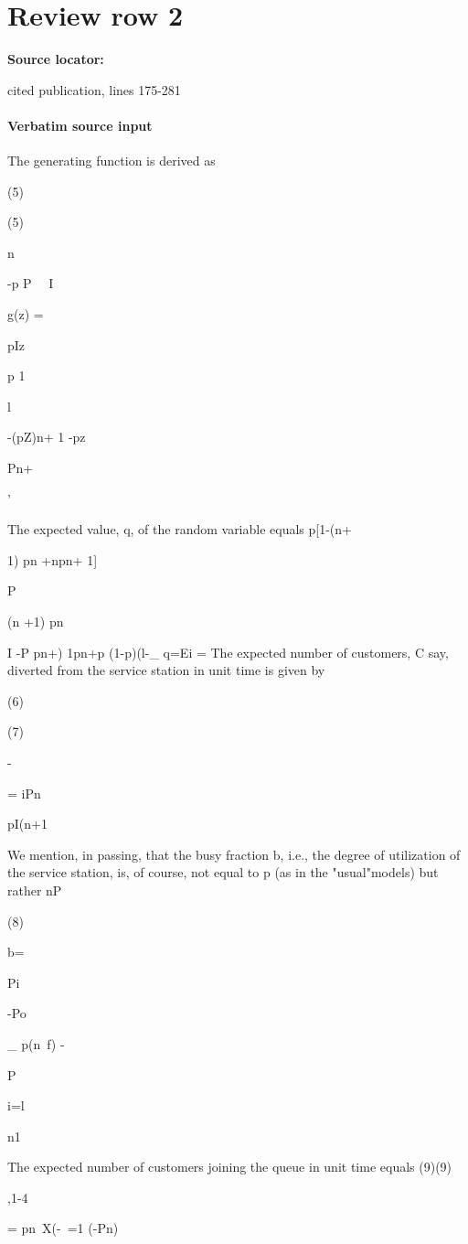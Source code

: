 \documentclass[10pt]{article}
\begin{document}
\section*{Review row 2}
\textbf{Source locator:} {\footnotesize\raggedright cited publication, lines 175-\allowbreak{}281\par}
\paragraph{Verbatim source input}
\begin{ReviewVerbatim}
The generating function is derived as

(5)

(5)

n

-p P
~~I

g(z) =

pIz

p 1

l

-(pZ)n+
1 -pz

Pn+

'

The expected value, q, of the random variable equals
p[1-(n+

1) pn +npn+ 1]

P

(n +1) pn

I -P
pn+)
1pn+p
(1-p)(l-_
q=E{i} =
The expected number of customers, C say, diverted from the service station in
unit time is given by

(6)

(7)

-

= iPn

pI(n+1

We mention, in passing, that the busy fraction b, i.e., the degree of utilization of
the service station, is, of course, not equal to p (as in the "usual"models) but rather
nP

(8)

b=

Pi

-Po

_ p(n~f)
-

P

i=l

n1

The expected number of customers joining the queue in unit time equals
(9)(9)

,1-4

= pn~X(-~=1
(-Pn)


\end{ReviewVerbatim}
\end{document}

